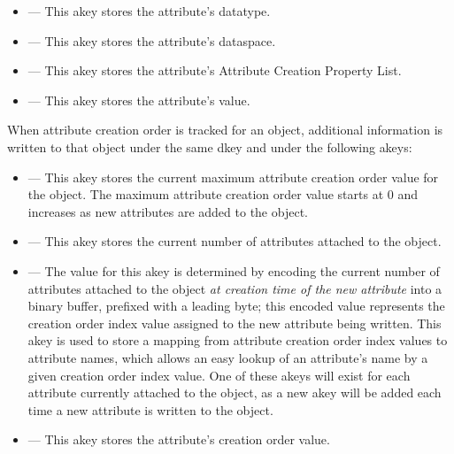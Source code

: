 \documentclass[../design_doc.tex]{subfiles}
\begin{document}
\begin{itemize}
 \item {} --- This \gls{akey} stores the attribute's datatype.
 \item {} --- This \gls{akey} stores the attribute's dataspace.
 \item {} --- This \gls{akey} stores the attribute's Attribute Creation Property List.
 \item {} --- This \gls{akey} stores the attribute's value.
\end{itemize}

When attribute creation order is tracked for an object, additional information is written to that object under the same  \gls{dkey} and under the following \glspl{akey}:

\begin{itemize}
 \item {} --- This \gls{akey} stores the current maximum attribute creation order value for the object. The maximum attribute creation order value starts at 0 and increases as new attributes are added to the object.
 \item {} --- This \gls{akey} stores the current number of attributes attached to the object.
 \item {} --- The value for this \gls{akey} is determined by encoding the current number of attributes attached to the object \textit{at creation time of the new attribute} into a binary buffer, prefixed with a leading  byte; this encoded value represents the creation order index value assigned to the new attribute being written. This \gls{akey} is used to store a mapping from attribute creation order index values to attribute names, which allows an easy lookup of an attribute's name by a given creation order index value. One of these \glspl{akey} will exist for each attribute currently attached to the object, as a new \gls{akey} will be added each time a new attribute is written to the object.
 \item {} --- This \gls{akey} stores the attribute's creation order value.
\end{itemize}


\newpage
\end{document}
